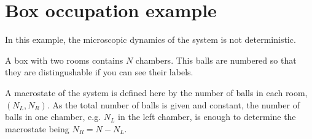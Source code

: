 \documentclass[letterpaper,10pt,english]{jupyterBook}
\begin{document}
\section{Box occupation example}
\label{\detokenize{ch/statistical-mechanics/entropy:box-occupation-example}}\label{\detokenize{ch/statistical-mechanics/entropy:statistical-mechanics-entropy-box-occupation}}
\sphinxAtStartPar
{} In this example, the microscopic dynamics of the system is not deterministic.

\sphinxAtStartPar
A box with two rooms contains \(N\) chambers. This balls are numbered so that they are distingushable if you can see their labels.

\sphinxAtStartPar
{} A macrostate of the system is defined here by the number of balls in each room, \((N_L, N_R)\). As the total number of balls is given and constant, the number of balls in one chamber, e.g. \(N_L\) in the left chamber, is enough to determine the macrostate being \(N_R = N - N_L\).
\end{document}
